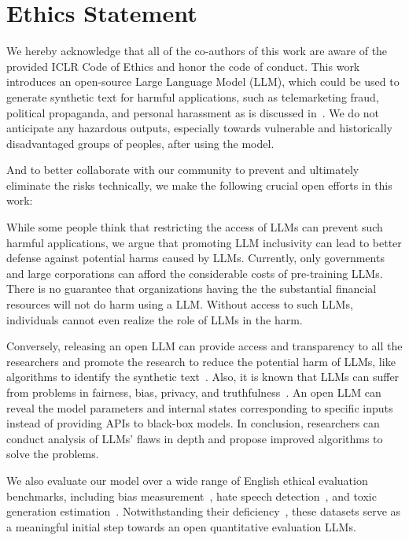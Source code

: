 \section*{Ethics Statement}
We hereby acknowledge that all of the co-authors of this work are aware of the provided ICLR Code of Ethics and honor the code of conduct.
This work introduces an open-source Large Language Model (LLM), which could be used to generate synthetic text for harmful applications, such as telemarketing fraud, political propaganda, and personal harassment as is discussed in~\citep{weidinger2021ethical,Sheng2021SocietalBI,Dev2021HarmsOG}. 
We do not anticipate any hazardous outputs, especially towards vulnerable and historically disadvantaged groups of peoples, after using the model.

And to better collaborate with our community to prevent and ultimately eliminate the risks technically, we make the following crucial open efforts in this work:

While some people think that restricting the access of LLMs can prevent such harmful applications, we argue that promoting LLM inclusivity can lead to better defense against potential harms caused by LLMs. 
Currently, only governments and large corporations can afford the considerable costs of pre-training LLMs. 
There is no guarantee that organizations having the the substantial financial resources will not do harm using a LLM. 
Without access to such LLMs, individuals cannot even realize the role of LLMs in the harm. 

Conversely, releasing an open LLM can provide access and transparency to all the researchers and promote the research to reduce the potential harm of LLMs, like algorithms to identify the synthetic text~\cite{gehrmann2019gltr}. 
Also, it is known that LLMs can suffer from problems in fairness, bias, privacy, and truthfulness~\cite{abs-2112-12938,lin2022truthfulqa,Liang2021SocialBias,Bender2021Danger}. 
An open LLM can reveal the model parameters and internal states corresponding to specific inputs instead of providing APIs to black-box models. 
In conclusion, researchers can conduct analysis of LLMs' flaws in depth and propose improved algorithms to solve the problems. 

We also evaluate our model over a wide range of English ethical evaluation benchmarks, including bias measurement~\citep{nadeem2021stereoset,nangia2020crows}, hate speech detection~\citep{mollas2020ethos}, and toxic generation estimation~\citep{gehman2020realtoxicityprompts}.
Notwithstanding their deficiency~\citep{blodgett2021stereotyping,jacobs2021measurement}, these datasets serve as a meaningful initial step towards an open quantitative evaluation LLMs.


